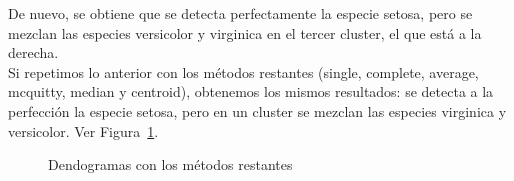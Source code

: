 \documentclass[12pt,a4paper,twoside,openright,titlepage,final]{article}
\begin{document}
De nuevo, se obtiene que se detecta perfectamente la especie setosa, pero se mezclan las especies versicolor y virginica en el tercer cluster, el que está a la derecha.\\

Si repetimos lo anterior con los métodos restantes (single, complete, average, mcquitty, median y centroid), obtenemos los mismos resultados: se detecta a la perfección la especie setosa, pero en un cluster se mezclan las especies virginica y versicolor. Ver Figura~\ref{fig:dendogramas_otros_metodos}.\\

\begin{figure}[htbp]
\centering
{}
\caption{Dendogramas con los métodos restantes} \label{fig:dendogramas_otros_metodos}
\end{figure}
\end{document}
